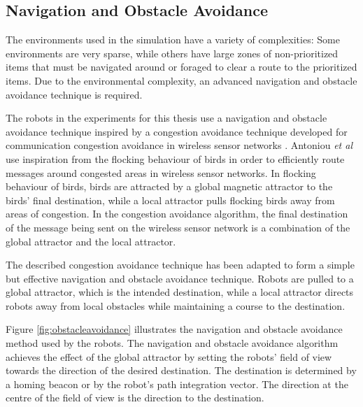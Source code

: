 \subsection{Navigation and Obstacle Avoidance}
\label{navigationandobstacleavoidance}

The environments used in the simulation have a variety of complexities: Some environments are very sparse, while others have large zones of non-prioritized items that must be navigated around or foraged to clear a route to the prioritized items. Due to the environmental complexity, an advanced navigation and obstacle avoidance technique is required.

The robots in the experiments for this thesis use a navigation and obstacle avoidance technique inspired by a congestion avoidance technique developed for communication congestion avoidance in wireless sensor networks \cite{antoniou2012congestion}. Antoniou \textit{et al} use inspiration from the flocking behaviour of birds in order to efficiently route messages around congested areas in wireless sensor networks. In flocking behaviour of birds, birds are attracted by a global magnetic attractor to the birds' final destination, while a local attractor pulls flocking birds away from areas of congestion. In the congestion avoidance algorithm, the final destination of the message being sent on the wireless sensor network is a combination of the global attractor and the local attractor.

The described congestion avoidance technique has been adapted to form a simple but effective navigation and obstacle avoidance technique. Robots are pulled to a global attractor, which is the intended destination, while a local attractor directs robots away from local obstacles while maintaining a course to the destination.

Figure \ref{fig:obstacleavoidance} illustrates the navigation and obstacle avoidance method used by the robots. The navigation and obstacle avoidance algorithm achieves the effect of the global attractor by setting the robots' field of view towards the direction of the desired destination. The destination is determined by a homing beacon or by the robot's path integration vector. The direction at the centre of the field of view is the direction to the destination. 

